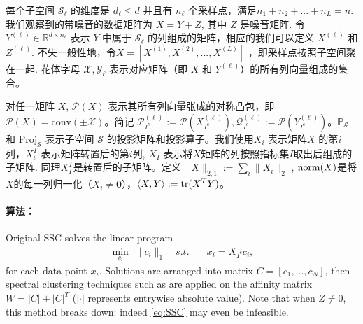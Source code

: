 \documentclass{ctexart}
\begin{document}
每个子空间 $\mathcal{S}_{\ell}$ 的维度是 $d_{\ell} \le d$ 并且有 $n_{\ell}$
个采样点，满足$n_1 +n_2+...+n_L=n$. 我们观察到的带噪音的数据矩阵为 $X = Y+Z$,
其中 $Z$ 是噪音矩阵. 令 $Y^{(\ell)}\in \mathbb{R}^{d\times n_{\ell}}$ 表示 
$Y$ 中属于 $\mathcal{S}_{\ell}$ 的列组成的矩阵，相应的我们可以定义 $X^{(\ell)}$ 和 $Z^{(\ell)}$.
不失一般性地，令$X=[X^{(1)},X^{(2)},...,X^{(L)}]$ ，即采样点按照子空间聚在一起.
花体字母 $\mathcal{X},\mathcal{Y_{\ell}}$ 表示对应矩阵（即 $X$ 和 $Y^{(\ell)}$）的所有列向量组成的集合。

对任一矩阵 $X$, $\mathcal{P}(X)$ 表示其所有列向量张成的对称凸包，即
$\mathcal{P}(X) = \mathrm{conv}(\pm \mathcal{X})$。简记
$\mathcal{P}_{I^c}^{(\ell)} := \mathcal{P}(X_{I^c}^{(\ell)}), \mathcal{Q}_{I^c}^{(\ell)} :=
\mathcal{P}(Y_{I^c}^{(\ell)})$。$\mathbb{P}_{\mathcal{S}}$ 和
$\mathrm{Proj}_{\mathcal{S}}$ 表示子空间 $\mathcal{S}$
的投影矩阵和投影算子。我们使用$X_i$ 表示矩阵$X$ 的第$i$列，$X_i^T$ 表示矩阵转置后的第$i$列, $X_I$
表示将$X$矩阵的列按照指标集$I$取出后组成的子矩阵.
同理$X^T_I$是转置后的子矩阵。定义$\|X\|_{2, 1}:= \sum_i \|X_i\|_2$ ,
$\mathrm{norm}(X)$是将$X$的每一列归一化（$X_i \neq \mathbf{0}$），$\langle X, Y \rangle
:= \mathrm{tr}(X^T Y)$。

\paragraph{算法： }
Original SSC solves the linear program
    \begin{equation}\label{eq:SSC}
    \begin{aligned}
    \min_{c_i} \; \|c_i\|_1 \quad s.t. \quad &x_i=X_{I^c}c_i,
    \end{aligned}
    \end{equation}
for each data point $x_i$. Solutions are arranged into matrix $C=[c_1,...,c_N]$, then spectral clustering techniques such as \cite{ng2002spectral} are applied on the affinity matrix $W=|C|+|C|^T$ ($|\cdot|$ represents entrywise absolute value). Note that when $Z\neq 0$, this method breaks down: indeed \eqref{eq:SSC} may even be infeasible.
\end{document}
